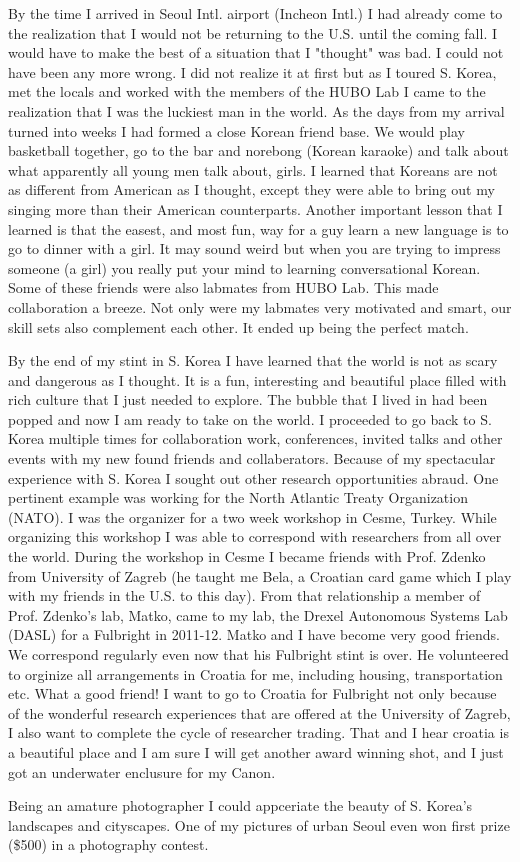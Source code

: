 \documentclass[12pt]{article}
\begin{document}
	By the time I arrived in Seoul Intl. airport (Incheon Intl.) I had already come to the realization that I would not be returning to the U.S. until the coming fall.  
I would have to make the best of a situation that I "thought" was bad.  
I could not have been any more wrong.  
I did not realize it at first but as I toured S. Korea, met the locals and worked with the members of the HUBO Lab I came to the realization that I was the luckiest man in the world. 
 As the days from my arrival turned into weeks I had formed a close Korean friend base.
We would play basketball together, go to the bar and norebong (Korean karaoke) and talk about what apparently all young men talk about, girls.  
I learned that Koreans are not as different from American as I thought, except they were able to bring out my singing more than their American counterparts.  
Another important lesson that I learned is that the easest, and most fun, way for a guy learn a new language is to go to dinner with a girl.
It may sound weird but when you are trying to impress someone (a girl) you really put your mind to learning conversational Korean.  
Some of these friends were also labmates from HUBO Lab.
This made collaboration a breeze.  
Not only were my labmates very motivated and smart, our skill sets also complement each other.  
It ended up being the perfect match.  



By the end of my stint in S. Korea I have learned that the world is not as scary and dangerous as I thought.
It is a fun, interesting and beautiful place filled with rich culture that I just needed to explore.
The bubble that I lived in had been popped and now I am ready to take on the world.  
I proceeded to go back to S. Korea multiple times for collaboration work, conferences, invited talks and other events with my new found friends and collaberators.  
Because of my spectacular experience with S. Korea I sought out other research opportunities abraud.  
One pertinent example was working for the North Atlantic Treaty Organization (NATO).
I was the organizer for a two week workshop in Cesme, Turkey.  
While organizing this workshop I was able to correspond with researchers from all over the world.  
During the workshop in Cesme I became friends with Prof. Zdenko from University of Zagreb (he taught me Bela, a Croatian card game which I play with my friends in the U.S. to this day).  
From that relationship a member of Prof. Zdenko’s lab, Matko, came to my lab, the Drexel Autonomous Systems Lab (DASL) for a Fulbright in 2011-12.  
Matko and I have become very good friends.
We correspond regularly even now that his Fulbright stint is over.  
He volunteered to orginize all arrangements in Croatia for me, including housing, transportation etc.  What a good friend!
I want to go to Croatia for Fulbright not only because of the wonderful research experiences that are offered at the University of Zagreb, I also want to complete the cycle of researcher trading.  
That and I hear croatia is a beautiful place and I am sure I will get another award winning shot, and I just got an underwater enclusure for my Canon\texttrademark.

Being an amature photographer I could appceriate the beauty of S. Korea's  landscapes and cityscapes.
One of my pictures of urban Seoul even won first prize (\$500) in a photography contest. 
\end{document}
